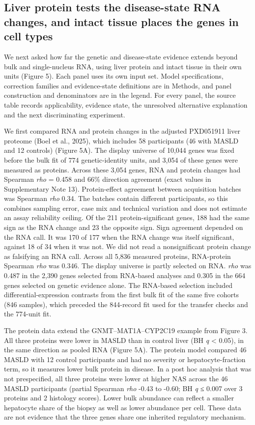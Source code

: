\subsection{Liver protein tests the disease-state RNA changes, and intact tissue places the genes in cell types}\label{liver-protein-tests-the-disease-state-rna-changes-and-intact-tissue-places-the-genes-in-cell-types}

We next asked how far the genetic and disease-state evidence extends beyond bulk
and single-nucleus RNA, using liver protein and intact tissue in their own units
(Figure 5). Each panel uses its own input set. Model specifications, correction
families and evidence-state definitions are in Methods, and panel construction
and denominators are in the legend. For every panel, the source table records
applicability, evidence state, the unresolved alternative explanation and the
next discriminating experiment.

We first compared RNA and protein changes in the adjusted PXD051911 liver
proteome (Boel et al., 2025), which includes 58
participants (46 with MASLD and 12 controls) (Figure 5A). The display universe
of 10,044 genes was fixed before the bulk fit of 774 genetic-identity
units, and 3,054 of these genes were measured as proteins. Across these 3,054
genes, RNA and protein changes had Spearman \emph{rho} = 0.458 and 66\% direction
agreement (exact values in Supplementary Note 13). Protein-effect agreement between acquisition batches was Spearman \emph{rho} 0.34.
The batches contain different participants, so this combines sampling error,
case mix and technical variation and does not estimate an assay reliability ceiling. Of the 211
protein-significant genes, 188 had the same sign as the RNA change and 23 the
opposite sign. Sign agreement depended on the RNA call. It was 170 of 177 when
the RNA change was itself significant, against 18 of 34 when it
was not. We did not read a nonsignificant protein change as falsifying an RNA
call. Across all 5,836 measured proteins, RNA-protein Spearman \emph{rho} was 0.346.
The display universe is partly selected on RNA. \emph{rho} was 0.487 in the 2,390
genes selected from RNA-based analyses and 0.305 in the 664 genes selected on
genetic evidence alone. The RNA-based selection included differential-expression
contrasts from the first bulk fit of the same five cohorts (846 samples), which
preceded the 844-record fit used for the transfer checks and the 774-unit fit.

The protein data extend the GNMT--MAT1A--CYP2C19 example from Figure 3. All three
proteins were lower in MASLD than in control liver (BH \emph{q} \textless{} 0.05), in the same
direction as pooled RNA (Figure 5A). The protein model compared 46 MASLD with 12
control participants and had no severity or hepatocyte-fraction term, so it
measures lower bulk protein in disease. In a post hoc analysis that was not
prespecified, all three proteins were lower at higher NAS across the 46 MASLD
participants (partial Spearman \emph{rho} -0.43 to -0.60; BH \emph{q} ≤ 0.007 over 3
proteins and 2 histology scores). Lower bulk abundance can reflect a smaller
hepatocyte share of the biopsy as well as lower abundance per cell. These data
are not evidence that the three genes share one inherited regulatory mechanism.

